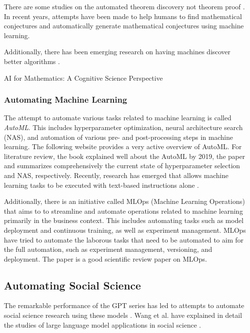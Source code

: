 \documentclass{article}
\begin{document}
There are some studies on the automated theorem discovery not theorem proof \cite{gao2014systematic}. In recent years, attempts have been made to help humans to find mathematical conjectures \cite{davies2021advancing} and
automatically generate mathematical conjectures \cite{raayoni2021generating,mishra2023mathematical}  using machine learning.

Additionally, there has been emerging research on having machines discover better algorithms \cite{mankowitz2023faster,fawzi2022discovering}.

AI for Mathematics: A Cognitive Science Perspective \cite{zhang2023ai}

\subsubsection{Automating Machine Learning}
The attempt to automate various tasks related to machine learning is called \textit{AutoML}. This includes hyperparameter optimization, neural architecture search (NAS), and automation of various pre- and post-processing steps in machine learning. The following website \cite{automlorg} provides a very active overview of AutoML. For literature review, the book \cite{hutter2019automated} explained well about the AutoML by 2019, the paper \cite{bischl2023hyperparameter} and \cite{lindauer2020best,white2023neural} summarizes comprehensively the current state of hyperparameter selection and NAS, respectively. Recently, research has emerged that allows machine learning tasks to be executed with text-based instructions alone \cite{vijay2023prompt}.

Additionally, there is an initiative called MLOps (Machine Learning Operations) that aims to to streamline and automate operations related to machine learning primarily in the business context. This includes automating tasks such as model deployment and continuous training, as well as experiment management. MLOps have tried to automate the laborous tasks that need to be automated to aim for the full automation, such as experiment management, versioning, and deployment. The paper \cite{kreuzberger2023machine} is a good scientific review paper on MLOps.

\cite{zheng2023can}

\subsection{Automating Social Science}

The remarkable performance of the GPT series has led to attempts to automate social science research using these models \cite{bail2023can,ziems2023can,park2023generative,horton2023large}. Wang et al. have explained in detail the studies of large language model applications in social science \cite{wang2023survey}.
\end{document}
